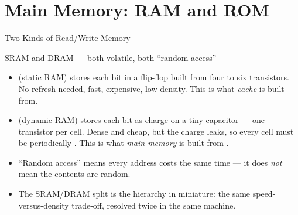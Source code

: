 \documentclass[aspectratio=169]{beamer}
\begin{document}
\section{Main Memory: RAM and ROM}

\begin{frame}{Two Kinds of Read/Write Memory}
  \begin{block}{SRAM and DRAM --- both volatile, both ``random access''}
    \begin{itemize}
      \item {} (static RAM) stores each bit in a flip-flop built from
        four to six transistors. No refresh needed, fast, expensive, low
        density. This is what \emph{cache} is built from.
      \item {} (dynamic RAM) stores each bit as charge on a tiny
        capacitor --- one transistor per cell. Dense and cheap, but the charge
        leaks, so every cell must be periodically . This is
        what \emph{main memory} is built from
        \cite[\S6.1, PDF pp.~226--236]{Stallings2015_computer_organization}.
    \end{itemize}
  \end{block}
  \begin{itemize}
    \item ``Random access'' means every address costs the same time --- it does
      \emph{not} mean the contents are random.
    \item The SRAM/DRAM split is the hierarchy in miniature: the same
      speed-versus-density trade-off, resolved twice in the same machine.
  \end{itemize}
\end{frame}
\end{document}
